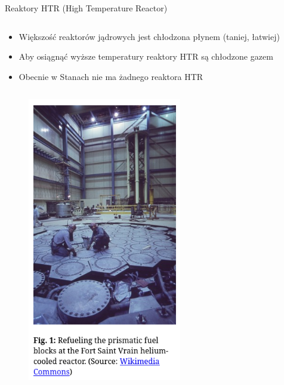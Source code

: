 \begin{columnframe}{Reaktory HTR (High Temperature Reactor)}
    \begin{column}{0.5\textwidth}
        \begin{itemize}
            \item Większość reaktorów jądrowych jest chłodzona płynem (taniej, łatwiej)
            \item Aby osiągnąć wyższe temperatury reaktory HTR są chłodzone gazem
            \item Obecnie w Stanach nie ma żadnego reaktora HTR
        \end{itemize}
    \end{column}
    \begin{column}{0.5\textwidth}
        \begin{figure}
            \centering
            \includegraphics[width=0.6\textwidth, frame]{images/ft_st_vrain_refuel.png}
        \end{figure}
    \end{column}
\end{columnframe}


